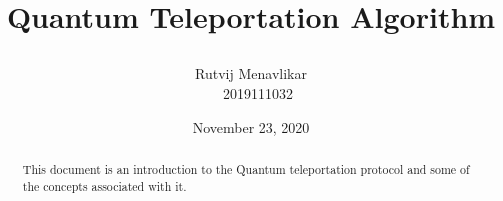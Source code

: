 \documentclass[a4paper]{article}
\begin{document}
	\title{

	\vspace{1cm}
	\Huge Quantum Teleportation Algorithm
	}

	\vspace{1cm}


	\author{\Large {Rutvij Menavlikar} \Large \\  \ \ 2019111032
	\date{November 23, 2020}
	\vspace{0.5cm}}

	\maketitle
	\setlength{\parindent}{0pt}

\vspace{8cm}
\begin{abstract}
\begin{center}
\normalsize
This document is an introduction to the Quantum teleportation protocol and some of the concepts associated with it.
\end{center}
\end{abstract}
	\newpage
	\tableofcontents
	\newpage

\maketitle
\end{document}
